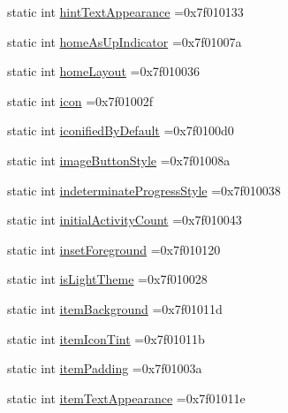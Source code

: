 \begin{DoxyCompactItemize}
\item 
static int \hyperlink{classandroid_1_1support_1_1v7_1_1mediarouter_1_1R_1_1attr_ac1d60bd46c49be81b781c430a18125ff}{hint\+Text\+Appearance} =0x7f010133
\item 
static int \hyperlink{classandroid_1_1support_1_1v7_1_1mediarouter_1_1R_1_1attr_aef82f0702653b8305457086c422d866c}{home\+As\+Up\+Indicator} =0x7f01007a
\item 
static int \hyperlink{classandroid_1_1support_1_1v7_1_1mediarouter_1_1R_1_1attr_ab1808031f49fef5d4045c7311bc2d9f2}{home\+Layout} =0x7f010036
\item 
static int \hyperlink{classandroid_1_1support_1_1v7_1_1mediarouter_1_1R_1_1attr_a36a78f6af61f38fe96606868a1664662}{icon} =0x7f01002f
\item 
static int \hyperlink{classandroid_1_1support_1_1v7_1_1mediarouter_1_1R_1_1attr_a5691ffb921d3194a5b3e342ee2a6ecc6}{iconified\+By\+Default} =0x7f0100d0
\item 
static int \hyperlink{classandroid_1_1support_1_1v7_1_1mediarouter_1_1R_1_1attr_ab224fe2322d8781a607f7384308300d0}{image\+Button\+Style} =0x7f01008a
\item 
static int \hyperlink{classandroid_1_1support_1_1v7_1_1mediarouter_1_1R_1_1attr_a21cd5b179ec241544f87b4e808a38dca}{indeterminate\+Progress\+Style} =0x7f010038
\item 
static int \hyperlink{classandroid_1_1support_1_1v7_1_1mediarouter_1_1R_1_1attr_a35a8733f813298d6a8d0da9b25e258ac}{initial\+Activity\+Count} =0x7f010043
\item 
static int \hyperlink{classandroid_1_1support_1_1v7_1_1mediarouter_1_1R_1_1attr_af9a8fe8a5b13e9eca1b11e8bcfbb2b6c}{inset\+Foreground} =0x7f010120
\item 
static int \hyperlink{classandroid_1_1support_1_1v7_1_1mediarouter_1_1R_1_1attr_a3e0d20450415bcad3b813be70ee05a5a}{is\+Light\+Theme} =0x7f010028
\item 
static int \hyperlink{classandroid_1_1support_1_1v7_1_1mediarouter_1_1R_1_1attr_ae9f584ebfd39f6050ec906e88cad7c0c}{item\+Background} =0x7f01011d
\item 
static int \hyperlink{classandroid_1_1support_1_1v7_1_1mediarouter_1_1R_1_1attr_a78d0574accf4f52f2f8f0b04c9934fad}{item\+Icon\+Tint} =0x7f01011b
\item 
static int \hyperlink{classandroid_1_1support_1_1v7_1_1mediarouter_1_1R_1_1attr_a7fc8391afad02325065f1f8739e50024}{item\+Padding} =0x7f01003a
\item 
static int \hyperlink{classandroid_1_1support_1_1v7_1_1mediarouter_1_1R_1_1attr_a57b6a8878a26dcbd7f69a1615dc2a32b}{item\+Text\+Appearance} =0x7f01011e

\end{DoxyCompactItemize}

